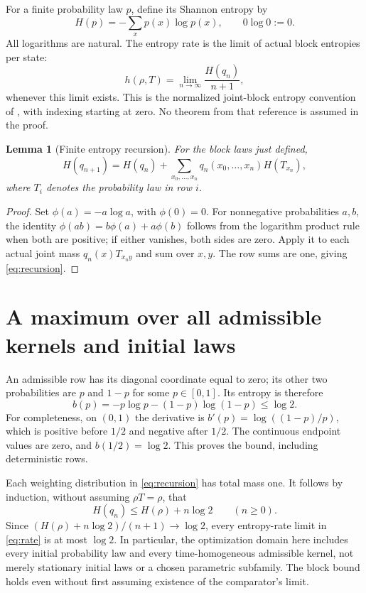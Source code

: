 \documentclass[10pt]{article}
\newtheorem{lemma}{Lemma}
\begin{document}
For a finite probability law $p$, define its Shannon entropy by
\[
 H(p)=-\sum_xp(x)\log p(x),\qquad 0\log0:=0.
\]
All logarithms are natural. The entropy rate is the limit of actual block entropies per state:
\begin{equation}\label{eq:rate}
 h(\rho,T)=\lim_{n\to\infty}\frac{H(q_n)}{n+1},
\end{equation}
whenever this limit exists. This is the normalized joint-block entropy convention of \cite[equation (1)]{han}, with indexing starting at zero. No theorem from that reference is assumed in the proof.

\begin{lemma}[Finite entropy recursion]\label{lem:chain}
For the block laws just defined,
\begin{equation}\label{eq:recursion}
 H(q_{n+1})=H(q_n)+\sum_{x_0,\ldots,x_n}q_n(x_0,\ldots,x_n)H(T_{x_n}),
\end{equation}
where $T_i$ denotes the probability law in row $i$.
\end{lemma}
\begin{proof}
Set $\phi(a)=-a\log a$, with $\phi(0)=0$. For nonnegative probabilities $a,b$, the identity
$\phi(ab)=b\phi(a)+a\phi(b)$ follows from the logarithm product rule when both are positive; if either vanishes, both sides are zero. Apply it to each actual joint mass $q_n(x)T_{x_ny}$ and sum over $x,y$. The row sums are one, giving \eqref{eq:recursion}.
\end{proof}

\section{A maximum over all admissible kernels and initial laws}
An admissible row has its diagonal coordinate equal to zero; its other two probabilities are $p$ and $1-p$ for some $p\in[0,1]$. Its entropy is therefore
\[
 b(p)=-p\log p-(1-p)\log(1-p)\le\log2.
\]
For completeness, on $(0,1)$ the derivative is $b'(p)=\log((1-p)/p)$, which is positive before $1/2$ and negative after $1/2$. The continuous endpoint values are zero, and $b(1/2)=\log2$. This proves the bound, including deterministic rows.

Each weighting distribution in \eqref{eq:recursion} has total mass one. It follows by induction, without assuming $\rho T=\rho$, that
\begin{equation}\label{eq:upper}
 H(q_n)\le H(\rho)+n\log2\qquad(n\ge0).
\end{equation}
Since $(H(\rho)+n\log2)/(n+1)\to\log2$, every entropy-rate limit in \eqref{eq:rate} is at most $\log2$. In particular, the optimization domain here includes every initial probability law and every time-homogeneous admissible kernel, not merely stationary initial laws or a chosen parametric subfamily. The block bound holds even without first assuming existence of the comparator's limit.
\end{document}
